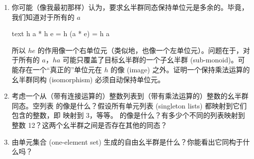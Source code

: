 \begin{enumerate}
  \tightlist
  \item
        你可能（像我最初那样）认为，要求幺半群同态保持单位元是多余的。毕竟，我们知道对于所有的 $a$

        \begin{snip}{text}
h a * h e = h (a * e) = h a
\end{snip}
        所以 $h e$ 的作用像一个右单位元（类似地，也像一个左单位元）。问题在于，对于所有的 $a$，$h a$ 可能只覆盖了目标幺半群的一个子幺半群 (sub-monoid)。可能存在一个“真正的”单位元在 $h$ 的像 (image) 之外。证明一个保持乘法运算的幺半群同构 (isomorphism) 必须自动保持单位元。
  \item
        考虑一个从（带有连接运算的）整数列表到（带有乘法运算的）整数的幺半群同态。空列表 \code{{[}{]}} 的像是什么？假设所有单元列表 (singleton lists) 都映射到它们包含的整数，即 \code{{[}3{]}} 映射到 3，等等。\code{{[}1, 2, 3, 4{]}} 的像是什么？有多少个不同的列表映射到整数 12？这两个幺半群之间是否存在其他的同态？
  \item
        由单元集合 (one-element set) 生成的自由幺半群是什么？你能看出它同构于什么吗？
\end{enumerate}
